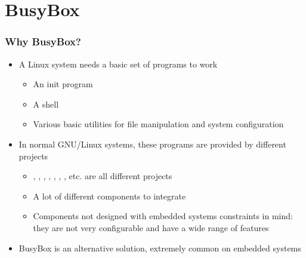 \section{BusyBox}

\begin{frame}
  \frametitle{Why BusyBox?}
  \begin{itemize}
  \item A Linux system needs a basic set of programs to work
    \begin{itemize}
    \item An init program
    \item A shell
    \item Various basic utilities for file manipulation and system
      configuration
    \end{itemize}
  \item In normal GNU/Linux systems, these programs are provided by
    different projects
    \begin{itemize}
    \item {}, , , ,
      , , , etc. are all different
      projects
    \item A lot of different components to integrate
    \item Components not designed with embedded systems constraints in
      mind: they are not very configurable and have a wide range of
      features
    \end{itemize}
  \item BusyBox is an alternative solution, extremely common on
    embedded systems
  \end{itemize}
\end{frame}

